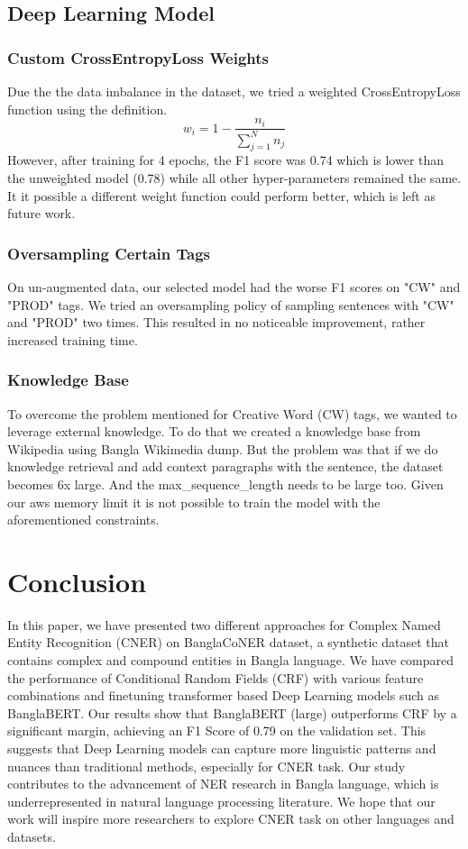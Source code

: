 \documentclass{article}
\begin{document}
\subsection{Deep Learning Model}
\subsubsection{Custom CrossEntropyLoss Weights}

Due the the data imbalance in the dataset, we tried a weighted CrossEntropyLoss function using the definition.
$$ w_i = 1 - \frac{n_i}{\sum_{j=1}^{N} n_j} $$
However, after training for 4 epochs, the F1 score was 0.74 which is lower than the unweighted model (0.78) while all other hyper-parameters remained the same. It it possible a different weight function could perform better, which is left as future work.

\subsubsection{Oversampling Certain Tags}
On un-augmented data, our selected model had the worse F1 scores on "CW" and "PROD" tags. We tried an oversampling policy of sampling sentences with "CW" and "PROD" two times. This resulted in no noticeable improvement, rather increased training time.

\subsubsection{Knowledge Base}
To overcome the problem mentioned for Creative Word (CW) tags, we wanted to leverage external knowledge. To do that we created a knowledge base from Wikipedia using Bangla Wikimedia dump. But the problem was that if we do knowledge retrieval and add context paragraphs with the sentence, the dataset becomes 6x large. And the max\_sequence\_length needs to be large too. Given our aws memory limit it is not possible to train the model with the aforementioned constraints. 

\section{Conclusion}
\label{sec:conclusion}

In this paper, we have presented two different approaches for Complex Named Entity Recognition (CNER) on BanglaCoNER dataset, a synthetic dataset that contains complex and compound entities in Bangla language. We have compared the performance of Conditional Random Fields (CRF) with various feature combinations and finetuning transformer based Deep Learning models such as BanglaBERT. Our results show that BanglaBERT (large) outperforms CRF by a significant margin, achieving an F1 Score of 0.79 on the validation set. This suggests that Deep Learning models can capture more linguistic patterns and nuances than traditional methods, especially for CNER task. Our study contributes to the advancement of NER research in Bangla language, which is underrepresented in natural language processing literature. We hope that our work will inspire more researchers to explore CNER task on other languages and datasets.



\end{document}
